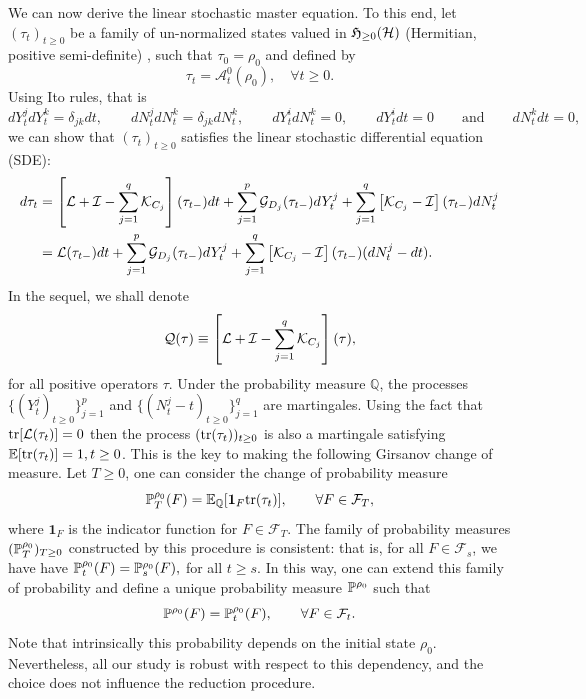 \documentclass[aihp,12pt]{imsart}
\begin{document}
We can now derive the linear stochastic master equation. To this end, let $(\tau_t)_{t\geq0}$ be a family of un-normalized states valued in $\mathfrak{H}_{\geq0}(\mathcal{H})$ (Hermitian, positive semi-definite) , such that $\tau_0=\rho_0$ and defined by
$$\tau_t=\mathcal A_t^0(\rho_0),\quad \forall t\geq0.$$ Using Ito rules, that is \[dY_t^jdY_t^k=\delta_{jk}dt,\qquad dN_t^jdN_t^k=\delta_{jk}dN_t^k,\qquad dY_t^idN_t^k=0,\qquad dY_t^idt=0\qquad\text{and}\qquad dN_t^kdt=0,\] we can show that $(\tau_t)_{t\geq0}$ satisfies the linear stochastic differential equation (SDE): 
\begin{equation}
\begin{split}
    d\tau_t &= \left[\mathcal{L} +\mathcal{I} - \sum_{j=1}^q \mathcal{K}_{C_j} \right](\tau_{t-}) dt + \sum_{j=1}^{p}\mathcal{G}_{D_j}(\tau_{t-}) dY_t^j +\sum_{j=1}^q \left[\mathcal{K}_{C_j}-\mathcal{I}\right](\tau_{t-}) dN_t^j\\
    &=\mathcal{L} (\tau_{t-}) dt + \sum_{j=1}^{p}\mathcal{G}_{D_j}(\tau_{t-}) dY_t^j +\sum_{j=1}^q \left[\mathcal{K}_{C_j}-\mathcal{I}\right](\tau_{t-}) (dN_t^j-dt).
\end{split}
    \label{eq:Belavkin-Zakai}
\end{equation}
In the sequel, we shall denote 
\begin{equation}
    \mathcal{Q}(\tau) \equiv \left[\mathcal{L} +\mathcal{I} - \sum_{j=1}^q \mathcal{K}_{C_j} \right](\tau),
\end{equation}
for all positive operators $\tau$. Under the probability measure $\mathbb Q$, the processes $\{(Y_t^j)_{t\geq0}\}_{j=1}^p$ and $\{(N_t^j-t)_{t\geq0}\}_{j=1}^q$ are martingales. Using the fact that ${\rm tr}[\mathcal{L}(\tau_t)]=0$ then the process $({\rm tr}(\tau_t))_{t\geq0}$ is also a martingale satisfying $\mathbb E[{\rm tr}(\tau_t)]=1, t\geq0$. This is the key to making the following Girsanov change of measure. Let $T\geq0$, one can consider the change of probability measure
$$\mathbb{P}^{\rho_0}_T(F)=\mathbb E_{\mathbb Q}[\mathbf 1_F{\rm tr}(\tau_t)], \qquad \forall F\in\mathcal F_T,$$
where $\mathbf 1_F$ is the indicator function for $F\in\mathcal F_T$.
The family of probability measures $(\mathbb{P}^{\rho_0}_T)_{T\geq 0}$ constructed by this procedure is consistent: that is, for all $F\in\mathcal F_s$, we have have $\mathbb{P}^{\rho_0}_t(F)=\mathbb{P}^{\rho_0}_s(F),$  for all $t\geq s$. In this way, one can extend this family of probability and define a unique probability measure $\mathbb{P}^{\rho_0}$ such that  $$\mathbb{P}^{\rho_0}(F)=\mathbb{P}^{\rho_0}_t(F),\qquad\forall F\in\mathcal F_t.$$  Note that intrinsically this probability depends on the initial state $\rho_0$. Nevertheless, all our study is robust with respect to this dependency, and the choice does not influence the reduction procedure.  
\end{document}
